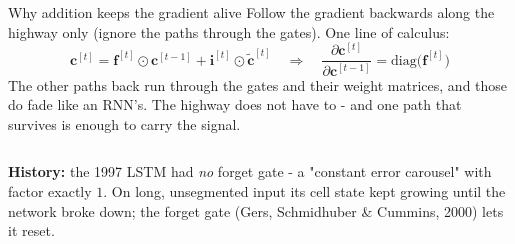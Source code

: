 \documentclass[aspectratio=169]{beamer}
\begin{document}
\begin{frame}{Why addition keeps the gradient alive}
  \small
  Follow the gradient backwards along the highway only (ignore the paths through the
  gates). One line of calculus:
  \[
    \mathbf{c}^{[t]} = \mathbf{f}^{[t]}\odot\mathbf{c}^{[t-1]}
      + \mathbf{i}^{[t]}\odot\tilde{\mathbf{c}}^{[t]}
    \quad\Longrightarrow\quad
    \frac{\partial \mathbf{c}^{[t]}}{\partial \mathbf{c}^{[t-1]}}
      = \mathrm{diag}\big(\mathbf{f}^{[t]}\big)
  \]
  The other paths back run through the gates and their weight matrices, and those do fade
  like an RNN's. The highway does not have to - and one path that survives is enough to
  carry the signal.
  \vskip 4pt
  \begin{columns}[T]
  \end{columns}
  \vskip 6pt
  {\footnotesize \textbf{History:} the 1997 LSTM had \emph{no} forget gate - a "constant
  error carousel" with factor exactly $1$. On long, unsegmented input its cell state kept
  growing until the network broke down; the forget gate (Gers, Schmidhuber \& Cummins,
  2000) lets it reset.\par}
\end{frame}
\end{document}
